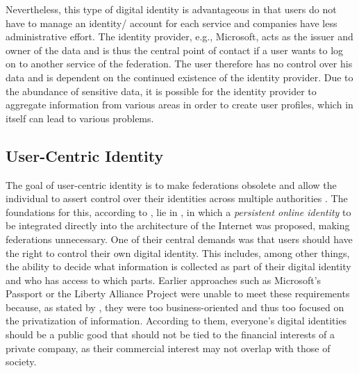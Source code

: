	    Nevertheless, this type of digital identity is advantageous in that users do not have to manage an identity/ account for each service and companies have less administrative effort. The identity provider, e.g., Microsoft, acts as the issuer and owner of the data and is thus the central point of contact if a user wants to log on to another service of the federation. The user therefore has no control over his data and is dependent on the continued existence of the identity provider. Due to the abundance of sensitive data, it is possible for the identity provider to aggregate information from various areas in order to create user profiles, which in itself can lead to various problems. \cite[pp. 6 - 7]{ehrlich_self-sovereign_2021}
	    
	    \subsection{User-Centric Identity}
	    The goal of user-centric identity is to make federations obsolete and allow the individual to assert control over their identities across multiple authorities \cite{allen_path_2016}. The foundations for this, according to \cite{allen_path_2016}, lie in \cite{jordan_augmented_2003}, in which a \textit{persistent online identity} to be integrated directly into the architecture of the Internet was proposed, making federations unnecessary. One of their central demands was that users should have the right to control their own digital identity. This includes, among other things, the ability to decide what information is collected as part of their digital identity and who has access to which parts. Earlier approaches such as Microsoft's Passport or the Liberty Alliance Project were unable to meet these requirements because, as stated by \cite{jordan_augmented_2003}, they were too business-oriented and thus too focused on the privatization of information. According to them, everyone's digital identities should be a public good that should not be tied to the financial interests of a private company, as their commercial interest may not overlap with those of society. 
	    
